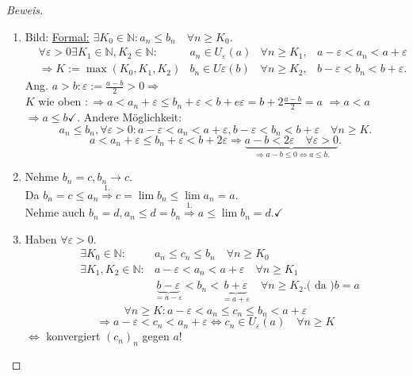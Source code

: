 \documentclass[12pt,a4paper,titlepage]{article} %
\theoremstyle{definition}
\theoremstyle{remark}
\newenvironment{bew}{\begin{proof}[Beweis]}{\end{proof}}
\newcommand{\N}{\mathbb{N}}
\begin{document}
\begin{bew}
	\begin{enumerate}
		\item Bild: 
		\underline{Formal:} \(\exists K_0 \in\N:a_n\leq b_n \quad \forall n\geq K_0. \)
		\begin{align*}
		&\forall \varepsilon > 0 \exists K_1 \in\N,K_2\in\N: &a_n \in U_\varepsilon(a) &\forall n\geq K_1, &a - \varepsilon < a_n < a+\varepsilon\\
		&\Rightarrow K := \max(K_0, K_1, K_2) &b_n \in U\varepsilon (b) &\forall n\geq K_2,  &b-\varepsilon < b_n < b+\varepsilon.
		\end{align*}
		Ang. \(a>b: \varepsilon := \frac{a-b}{2} > 0 \Rightarrow\)\\
		\(K \) wie oben \(:\Rightarrow a< a_n + \varepsilon \leq b_n + \varepsilon < b + e\varepsilon = b + 2 \frac{a-b}{2} = a \)
		\( \Rightarrow a<a\) \Lightning \(\Rightarrow a\leq b \checkmark\).
		Andere Möglichkeit:\\
		\[ a_n \leq b_n, \forall \varepsilon > 0: a-\varepsilon < a_n<a + \varepsilon, b-\varepsilon < b_n < b + \varepsilon \quad \forall n\geq K. \]
		\[ a < a_n + \varepsilon \leq b_n + \varepsilon < b + 2\varepsilon \Rightarrow \underbrace{a-b < 2\varepsilon \quad \forall \varepsilon > 0}_{\Rightarrow a-b\leq 0 \Leftrightarrow a\leq b.}. \]
		\item Nehme \(b_n = c, b_n \rightarrow c\).\\
		Da \(b_n = c \leq a_n \overset{1.}{\Rightarrow} c= \lim b_n \leq \lim a_n = a \).\\
		Nehme auch \(b_n = d, a_n \leq d = b_n \overset{1.}{\Rightarrow} a \leq \lim b_n = d. \checkmark \)
		\item Haben \(\forall \varepsilon > 0\).
		\begin{align*}
			&\exists K_0 \in\N: &a_n \leq c_n \leq b_n \quad \forall n\geq K_0\\
			&\exists K_1, K_2 \in\N: &a-\varepsilon < a_n < a + \varepsilon \quad \forall n\geq K_1\\
			&&\underbrace{b-\varepsilon}_{=a-\varepsilon} < b_n < \underbrace{b + \varepsilon}_{=a+\varepsilon} \quad \forall n \geq K_2. \text{( da )}b=a
		\end{align*}
		\[\forall  n\geq K: a-\varepsilon < a_n \leq c_n \leq b_n < a+\varepsilon \]
		\[ \Rightarrow a-\varepsilon < c_n < a_n + \varepsilon \Leftrightarrow c_n\in U_\varepsilon(a) \quad \forall n\geq K \] 
		\( \Leftrightarrow \) konvergiert \((c_n)_n\) gegen \(a\)!
	\end{enumerate}
\end{bew}
\end{document}
